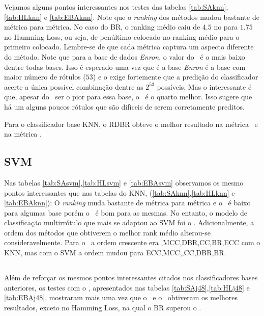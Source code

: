Vejamos alguns pontos interessantes nos testes das tabelas
\ref{tab:SAknn},\ref{tab:HLknn} e \ref{tab:EBAknn}.
Note que o \textit{ranking} dos métodos mudou bastante de métrica para métrica.
No caso do BR, o ranking médio caiu de $4.5$ no \SA para $1.75$ no Hamming Loss, ou seja,
de penúltimo colocado no ranking médio para o primeiro colocado. 
Lembre-se de que cada métrica captura um aspecto diferente do método.
Note que para a base de dados \textit{Enron}, o valor do \SA~é o mais baixo dentre todas bases.
Isso é esperado uma vez que é a base \textit{Enron} é a base com maior número de rótulos ($53$) e o \SA
exige fortemente que a predição do classificador acerte a única possível combinação dentre as $2^{53}$ possíveis.
Mas o interessante é que, apesar do \SA~ser o pior para essa base, o \HL~é o quarto melhor.
Isso sugere que há um alguns poucos rótulos que são difíceis de serem corretamente preditos.

Para o classificador base KNN, o RDBR obteve o melhor resultado na métrica \SA~e na métrica \EBA.


\subsection{SVM}




Nas tabelas
\ref{tab:SAsvm},\ref{tab:HLsvm} e \ref{tab:EBAsvm} observamos os mesmo pontos
interessantes que nas tabelas do KNN, (\ref{tab:SAknn},\ref{tab:HLknn} e \ref{tab:EBAknn}):
O \textit{ranking} muda bastante de métrica para métrica e o \SA~é baixo para algumas base porém
o \HL~é bom para as mesmas. No entanto, o modelo de classificação multirrótulo que mais se adaptou ao SVM foi
o \ECC. Adicionalmente, a ordem dos métodos que obtiverem o melhor rank médio alterou-se consideravelmente.
Para o \SA~a ordem crescente era \MRLMa,MCC,DBR,CC,BR,ECC com o KNN, mas com o SVM a ordem mudou para ECC,MCC,\MRLMa,CC,DBR,BR.

\subsection{\jqo}




Além de reforçar os mesmos pontos interessantes citados nos classificadores bases anteriores,
os testes com o \jqo, apresentados nas tabelas \ref{tab:SAj48},\ref{tab:HLj48} e \ref{tab:EBAj48}, mostraram mais uma vez que o \ECC~e o \MRLMa~obtiveram os melhores resultados, exceto
no Hamming Loss, na qual o BR superou o \MRLMa.

